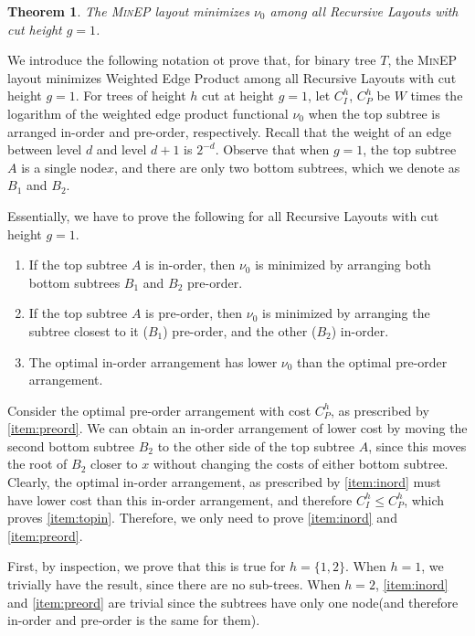 \documentclass[10pt,conference,letterpaper]{IEEEtran}
\newtheorem{theorem*}{Theorem}
\newcommand{\note}[1]{}
\newcommand{\comment}[1]{}
\newcommand{\node}{node\xspace}
\newcommand{\RLs}{Recursive Layouts\xspace}
\newcommand{\WEP}{Weighted Edge Product\xspace}
\newcommand{\pwmean}[1][p]{\ensuremath{\nu_{#1}}\xspace}
\newcommand{\minep}{\textsc{MinEP}\xspace}
\begin{document}
\begin{theorem*}The \minep layout minimizes \pwmean[0] among all \RLs with cut height $g=1$.
\end{theorem*}
\begin{IEEEproof}
We introduce the following notation ot prove that, for binary tree $T$, the \minep layout minimizes \WEP among all \RLs with cut height $g=1$.
For trees of height $h$ cut at height $g=1$, let $C_I^{h}$, $C_P^{h}$ be $W$ times the logarithm of the weighted edge product functional \pwmean[0] when the top subtree is arranged in-order and pre-order, respectively.
Recall that the weight of an edge between level $d$ and level $d+1$ is $2^{-d}$.
Observe that when $g=1$, the top subtree $A$ is a single \node $x$, and there are only two bottom subtrees, which we denote as $B_1$ and $B_2$. 
\note{We use subscripts $I$ and $P$ elsewhere. Changed here.}
\comment{
We make no assumptions on the arrangement of the bottom subtrees -- this is what \autoref{thm:order} proves. 
}
Essentially, we have to prove the following for all \RLs with cut height $g=1$. 
\begin{enumerate}
\item
\label{item:inord}
If the top subtree $A$ is in-order, then \pwmean[0] is minimized by arranging both bottom subtrees $B_{1}$ and $B_{2}$ pre-order.
\item
\label{item:preord}
If the top subtree $A$ is pre-order, then \pwmean[0] is minimized by arranging the subtree closest to it ($B_{1}$)  pre-order, and the other ($B_{2}$) in-order.
\item
\label{item:topin}
The optimal in-order arrangement has lower \pwmean[0] than the optimal pre-order arrangement. 
\end{enumerate}

Consider the optimal pre-order arrangement with cost $C_P^{h}$, as prescribed by \autoref{item:preord}. We can obtain an in-order arrangement of lower cost by moving the second bottom subtree $B_2$ to the other side of the top subtree $A$, since this moves the root of $B_2$ closer to $x$ without changing the costs of either bottom subtree. Clearly, the optimal in-order arrangement, as prescribed by \autoref{item:inord} must have lower cost than this in-order arrangement, and therefore $C_I^h \leq C_P^h$, which proves \autoref{item:topin}. Therefore, we only need to prove \autoref{item:inord} and \autoref{item:preord}.

First, by inspection, we prove that this is true for $h=\{1,2\}$. When $h = 1$, we trivially have the result, since there are no sub-trees. When $h=2$, \autoref{item:inord} and \autoref{item:preord} are trivial since the subtrees have only one \node (and therefore in-order and pre-order is the same for them). 



\end{IEEEproof}
\end{document}
